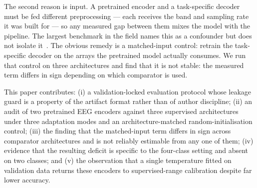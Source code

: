 The second reason is input. A pretrained encoder and a task-specific decoder
must be fed different preprocessing --- each receives the band and sampling
rate it was built for --- so any measured gap between them mixes the model with
the pipeline. The largest benchmark in the field names this as a confounder but
does not isolate it~\cite{kontras2026neuroatlas}. The obvious remedy is a
matched-input control: retrain the task-specific decoder on the arrays the
pretrained model actually consumes. We run that control on three architectures
and find that it is not stable: the measured term differs in sign depending on
which comparator is used.

This paper contributes: (i) a validation-locked evaluation protocol whose
leakage guard is a property of the artifact format rather than of author
discipline; (ii) an audit of two pretrained EEG encoders against three
supervised architectures under three adaptation modes and an
architecture-matched random-initialisation control; (iii) the finding that the
matched-input term differs in sign across comparator architectures and is not
reliably estimable from any one of them; (iv) evidence that the resulting deficit is specific to the four-class
setting and absent on two classes; and (v) the observation that a single
temperature fitted on validation data returns these encoders to supervised-range
calibration despite far lower accuracy.
